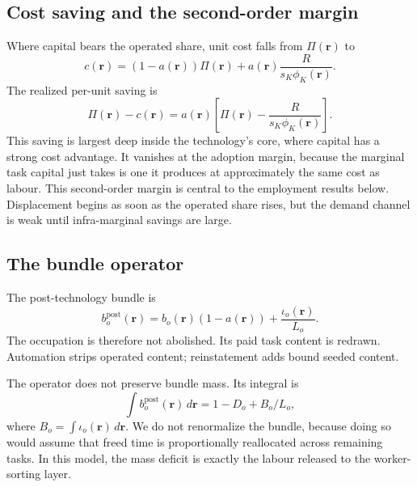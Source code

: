 \subsection{Cost saving and the second-order margin}
\label{sec:cost-saving}

Where capital bears the operated share, unit cost falls from
$\Pi(\mathbf{r})$ to
\begin{equation}
  c(\mathbf{r})
  =
  (1-a(\mathbf{r}))\Pi(\mathbf{r})
  +
  a(\mathbf{r})
  \frac{R}{s_K\phi_K(\mathbf{r})}.
  \label{eq:unit-cost}
\end{equation}
The realized per-unit saving is
\[
  \Pi(\mathbf{r}) - c(\mathbf{r})
  =
  a(\mathbf{r})
  \left[
    \Pi(\mathbf{r})
    -
    \frac{R}{s_K\phi_K(\mathbf{r})}
  \right].
\]
This saving is largest deep inside the technology's core, where capital
has a strong cost advantage. It vanishes at the adoption margin, because
the marginal task capital just takes is one it produces at approximately
the same cost as labour. This second-order margin is central to the
employment results below. Displacement begins as soon as the operated
share rises, but the demand channel is weak until infra-marginal savings
are large.



\subsection{The bundle operator}
\label{sec:bundle-operator}

The post-technology bundle is
\begin{equation}
  b_o^{\text{post}}(\mathbf{r})
  =
  b_o(\mathbf{r})(1-a(\mathbf{r}))
  +
  \frac{\iota_o(\mathbf{r})}{L_o}.
  \label{eq:bundle-operator}
\end{equation}
The occupation is therefore not abolished. Its paid task content is
redrawn. Automation strips operated content; reinstatement adds bound
seeded content.

The operator does not preserve bundle mass. Its integral is
\[
  \int b_o^{\text{post}}(\mathbf{r})\,d\mathbf{r}
  =
  1 - D_o + B_o/L_o,
\]
where $B_o=\int\iota_o(\mathbf{r})\,d\mathbf{r}$. We do not renormalize
the bundle, because doing so would assume that freed time is
proportionally reallocated across remaining tasks. In this model, the
mass deficit is exactly the labour released to the worker-sorting
layer.

